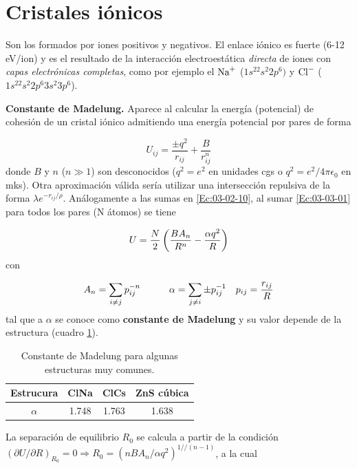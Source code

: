 
\section{Cristales iónicos}
Son los formados por iones positivos y negativos. El enlace iónico es fuerte (6-12 eV/ion) y es el resultado de la interacción electroestática \textit{directa} de iones con \textit{capas electrónicas completas}, como por ejemplo el $\text{Na}^+$ ($1s^22s^2 2p^6)$ y $\text{Cl}^-$ ($1s^22s^2 2p^6 3s^2 3p^6$).

\textbf{Constante de Madelung.} Aparece al calcular la energía (potencial) de cohesión de un cristal iónico admitiendo una energía potencial por pares de forma 

\begin{equation}
    U_{ij} = \frac{\pm q^2}{r_{ij}} + \frac{B}{r_{ij}^n} \label{Ec:03-03-01}
\end{equation} 
donde $B$ y $n$ ($n\gg 1$) son desconocidos ($q^2 = e^2$ en unidades cgs o $q^2=e^2 / 4 \pi \epsilon_0$ en mks). Otra aproximación válida sería utilizar una intersección repulsiva de la forma $\lambda e^{-r_{ij}/\rho}$. Análogamente a las sumas en \ref{Ec:03-02-10}, al sumar \ref{Ec:03-03-01} para todos los pares (N átomos) se tiene 

\begin{equation}
    U = \frac{N}{2} \left( \frac{BA_n}{R^n}-\frac{\alpha q^2}{R} \right)
\end{equation}
con 

\begin{equation}
    A_n = \sum_{i\neq j} p_{ij}^{-n} \quad \quad \quad \alpha = \sum_{j \neq i} \pm p_{ij}^{-1} \quad p_{ij} = \frac{r_{ij}}{R}
\end{equation}
tal que a $\alpha$ se conoce como \textbf{constante de Madelung} y su valor depende de la estructura (cuadro \ref{Tab:03-02}).

\begin{table}[h!] \centering
    \begin{tabular}{c|ccc}
        Estrucura & ClNa & ClCs & ZnS cúbica \\ \hline
        $\alpha$ & 1.748 & 1.763 & 1.638 
    \end{tabular}
    \caption{Constante de Madelung para algunas estructuras muy comunes.}
    \label{Tab:03-02}
\end{table}

La separación de equilibrio $R_0$ se calcula a partir  de la condición $(\partial U / \partial R)_{R_0} = 0 \Rightarrow R_0 = (nBA_n/\alpha q^2)^{1//(n-1)}$, a la cual

